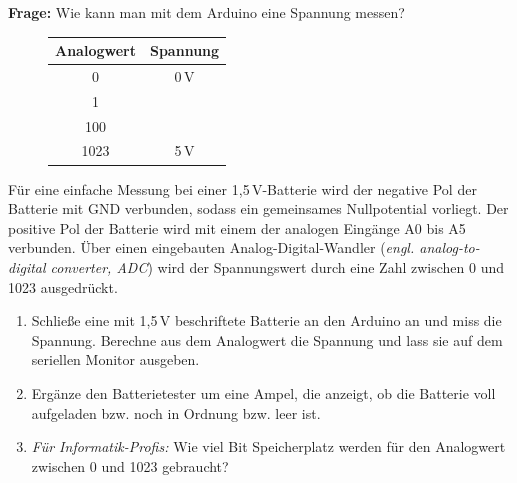 \begin{ziel}
	\textbf{Frage:} Wie kann man mit dem Arduino eine Spannung messen?
\end{ziel}

\begin{projekt}\label{proj:batterietesterklein}
	\begin{figure}
		\centering
		\begin{tabular}{c | c}
			\textbf{Analogwert} & \textbf{Spannung} \\ \hline
			0 & 0\,V \\ \hline
			1 &  \\ \hline
			100 &  \\ \hline
			1023 & 5\,V \\ \hline
		\end{tabular}
	\end{figure}
	Für eine einfache Messung bei einer 1,5\,V-Batterie wird der negative Pol der Batterie mit GND verbunden, sodass ein gemeinsames Nullpotential vorliegt. Der positive Pol der Batterie wird mit einem der analogen Eingänge A0 bis A5 verbunden. Über einen eingebauten Analog-Digital-Wandler (\emph{engl. analog-to-digital converter, ADC}) wird der Spannungswert durch eine Zahl zwischen 0 und 1023 ausgedrückt.
	 
	\begin{enumerate}[label=\alph*), itemsep=0mm, parsep=0mm]
	 	\item Schließe eine mit 1,5\,V beschriftete Batterie an den Arduino an und miss die Spannung. Berechne aus dem Analogwert die Spannung und lass sie auf dem seriellen Monitor ausgeben.
	 	\item Ergänze den Batterietester um eine Ampel, die anzeigt, ob die Batterie voll aufgeladen bzw. noch in Ordnung bzw. leer ist.
	 	\item \emph{Für Informatik-Profis:} Wie viel Bit Speicherplatz werden für den Analogwert zwischen 0 und 1023 gebraucht?
	\end{enumerate}	
\end{projekt}

